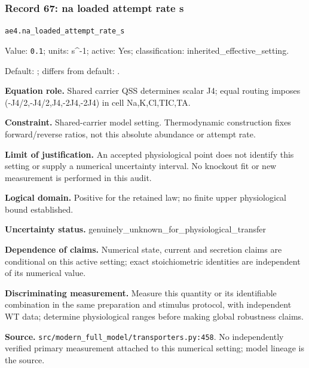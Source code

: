 \subsubsection*{Record 67: na loaded attempt rate s}
{\small \nolinkurl{ae4.na_loaded_attempt_rate_s}\par

Value: \texttt{0.1}; units: s\textasciicircum{}-1; active: Yes; classification: inherited\_effective\_setting.\par

Default: ; differs from default: .\par

\textbf{Equation role.} Shared carrier QSS determines scalar J4; equal routing imposes (-J4/2,-J4/2,J4,-2J4,-2J4) in cell Na,K,Cl,TIC,TA.\par

\textbf{Constraint.} Shared-carrier model setting. Thermodynamic construction fixes forward/reverse ratios, not this absolute abundance or attempt rate.\par

\textbf{Limit of justification.} An accepted physiological point does not identify this setting or supply a numerical uncertainty interval. No knockout fit or new measurement is performed in this audit.\par

\textbf{Logical domain.} Positive for the retained law; no finite upper physiological bound established.\par

\textbf{Uncertainty status.} genuinely\_unknown\_for\_physiological\_transfer\par

\textbf{Dependence of claims.} Numerical state, current and secretion claims are conditional on this active setting; exact stoichiometric identities are independent of its numerical value.\par

\textbf{Discriminating measurement.} Measure this quantity or its identifiable combination in the same preparation and stimulus protocol, with independent WT data; determine physiological ranges before making global robustness claims.\par

\textbf{Source.} \nolinkurl{src/modern_full_model/transporters.py:458}. No independently verified primary measurement attached to this numerical setting; model lineage is the source.\par}

